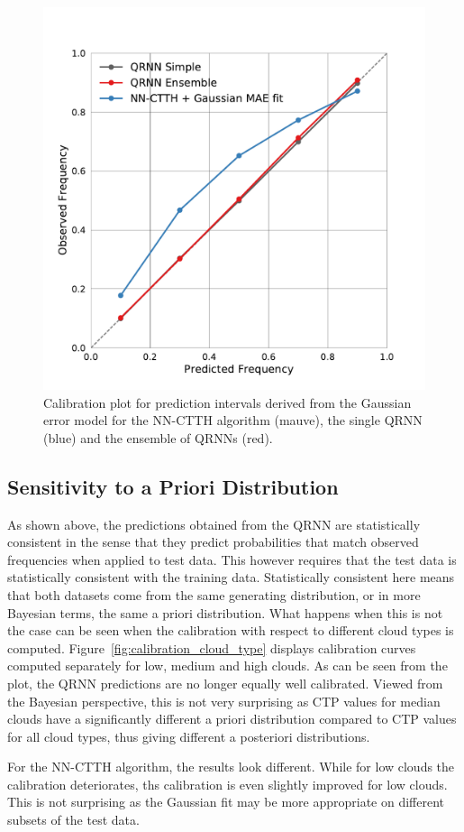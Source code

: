 \documentclass[journal abbreviation, manuscript]{copernicus}
\begin{document}
  \begin{figure}[hbpt!]
    \centering
    \includegraphics[width = 0.5\linewidth]{../plots/calibration_1}
    \caption{Calibration plot for prediction intervals derived from the Gaussian
      error model for the NN-CTTH algorithm (mauve), the single QRNN (blue) and
      the ensemble of QRNNs (red).}
    \label{fig:calibration}
  \end{figure}

\subsection{Sensitivity to a Priori Distribution}

As shown above, the predictions obtained from the QRNN are statistically
consistent in the sense that they predict probabilities that match observed
frequencies when applied to test data. This however requires that the test data
is statistically consistent with the training data. Statistically consistent
here means that both datasets come from the same generating distribution, or in
more Bayesian terms, the same a priori distribution. What happens when this is
not the case can be seen when the calibration with respect to different cloud
types is computed. Figure~\ref{fig:calibration_cloud_type} displays calibration
curves computed separately for low, medium and high clouds. As can be seen from the plot, the QRNN
predictions are no longer equally well calibrated. Viewed from the Bayesian
perspective, this is not very surprising as CTP values for median clouds have a
significantly different a priori distribution compared to CTP values for all
cloud types, thus giving different a posteriori distributions.

 For the NN-CTTH algorithm, the results look different. While for low clouds
the calibration deteriorates, ths calibration is even slightly improved for
low clouds. This is not surprising as the Gaussian fit may be more
appropriate on different subsets of the test data. 
\end{document}
